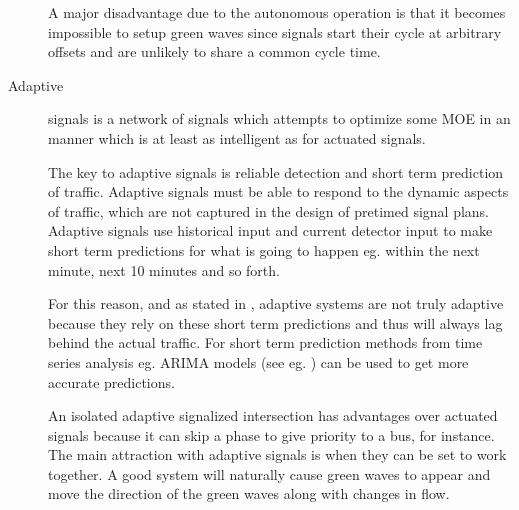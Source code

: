 \begin{description}
A major disadvantage due to the autonomous operation is that it becomes impossible to setup green waves since signals start their cycle at arbitrary offsets and are unlikely to share a common cycle time.

\item[Adaptive] signals is a network of signals which attempts to optimize some MOE in an manner which is at least as intelligent as for actuated signals. 

The key to adaptive signals is reliable detection and short term prediction of traffic. Adaptive signals must be able to respond to the dynamic aspects of traffic, which are not captured in the design of pretimed signal plans. Adaptive signals use historical input and current detector input to make short term predictions for what is going to happen eg. within the next minute, next 10 minutes and so forth. 

For this reason, and as stated in \cite{1}, adaptive systems are not truly adaptive because they rely on these short term predictions and thus will always lag behind the actual traffic. For short term prediction methods from time series analysis eg. ARIMA models (see eg. \cite{shortpredict}) can be used to get more accurate predictions.

An isolated adaptive signalized intersection has advantages over actuated signals because it can skip a phase to give priority to a bus, for instance. The main attraction with adaptive signals is when they can be set to work together. A good system will naturally cause green waves to appear and move the direction of the green waves along with changes in flow.
\end{description}